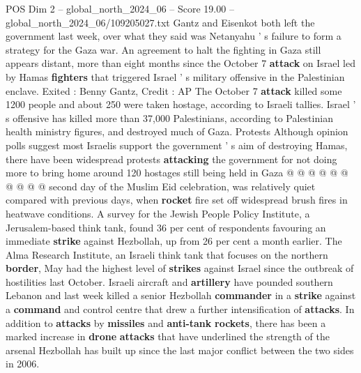 \begin{textsample}{POS Dim 2 – global\_north\_2024\_06 – Score 19.00 – global\_north\_2024\_06/109205027.txt}
Gantz and Eisenkot both left the government last week, over what they said was Netanyahu ' s failure to form a strategy for the Gaza war.
An agreement to halt the fighting in Gaza still appears distant, more than eight months since the October 7 \textbf{attack} on Israel led by Hamas \textbf{fighters} that triggered Israel ' s military offensive in the Palestinian enclave.
Exited : Benny Gantz, Credit : AP The October 7 \textbf{attack} killed some 1200 people and about 250 were taken hostage, according to Israeli tallies.
Israel ' s offensive has killed more than 37,000 Palestinians, according to Palestinian health ministry figures, and destroyed much of Gaza.
Protests Although opinion polls suggest most Israelis support the government ' s aim of destroying Hamas, there have been widespread protests \textbf{attacking} the government for not doing more to bring home around 120 hostages still being held in Gaza @ @ @ @ @ @ @ @ @ @ second day of the Muslim Eid celebration, was relatively quiet compared with previous days, when \textbf{rocket} fire set off widespread brush fires in heatwave conditions.
A survey for the Jewish People Policy Institute, a Jerusalem-based think tank, found 36 per cent of respondents favouring an immediate \textbf{strike} against Hezbollah, up from 26 per cent a month earlier.
The Alma Research Institute, an Israeli think tank that focuses on the northern \textbf{border}, May had the highest level of \textbf{strikes} against Israel since the outbreak of hostilities last October.
Israeli aircraft and \textbf{artillery} have pounded southern Lebanon and last week killed a senior Hezbollah \textbf{commander} in a \textbf{strike} against a \textbf{command} and control centre that drew a further intensification of \textbf{attacks}.
In addition to \textbf{attacks} by \textbf{missiles} and \textbf{anti-tank} \textbf{rockets}, there has been a marked increase in \textbf{drone} \textbf{attacks} that have underlined the strength of the arsenal Hezbollah has built up since the last major conflict between the two sides in 2006.

\end{textsample}
